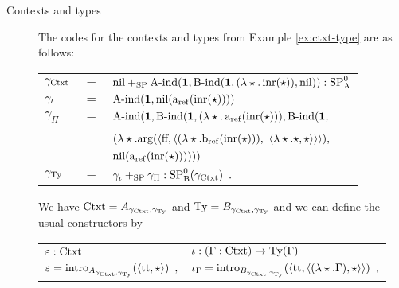\documentclass{article}
\begin{document}
\begin{description}







\item[Contexts and types]

The codes for the contexts and types from Example \ref{ex:ctxt-type} are as follows: \vskip
0.2cm
\begin{tabular}{lcl}
$\gamma_{\text{Ctxt}}$ &$=$& $\text{nil} +_{\text{SP}} \text{A-ind}(\mathbf{1}, \text{B-ind}(\mathbf{1}, (\lambda \star .\,\text{inr}(\star)),
\text{nil})) : \text{SP}^{0}_{\mathrm{A}}$ \\
$\gamma_{\iota}$ &$=$& $\text{A-ind}(\mathbf{1}, \text{nil}(\text{a}_{\mathrm{ref}}(\text{inr}(\star))))$ \\
$\gamma_{\Pi}$ &$=$& $\text{A-ind}(\mathbf{1}, \text{B-ind}(\mathbf{1}, (\lambda \star.\,\text{a}_{\mathrm{ref}}(\text{inr}(\star))),\text{B-ind}(\mathbf{1},$ \\
&& \qquad\quad $(\lambda \star.\text{arg}(\langle \text{ff}, \langle (\lambda
\star.\text{b}_{\mathrm{ref}}(\text{inr}(\star))),$ 
 $\langle \lambda \star.\star, \star\rangle\rangle\rangle),$ \\
&& \qquad\qquad $\text{nil}(\text{a}_{\mathrm{ref}}(\text{inr}(\star))))))$ \\
$\gamma_{\text{Ty}}$ &$=$& $\gamma_{\iota} +_{\text{SP}} \gamma_{\Pi} : \text{SP}^{0}_{\mathrm{B}}(\gamma_{\text{Ctxt}})\enspace .$
\end{tabular}
\vskip 0.2cm \noindent
We have $\text{Ctxt} = A_{\gamma_{\text{Ctxt}}, \gamma_{\text{Ty}}}$ and $\text{Ty} =
B_{\gamma_{\text{Ctxt}}, \gamma_{\text{Ty}}}$
and we can define the usual constructors by
\vskip 0.2cm
\begin{tabular}{l@{\qquad\qquad}l}
  $\varepsilon : \text{Ctxt}$ & $\iota : (\Gamma : \text{Ctxt}) \to \text{Ty}(\Gamma)$ \\
  $\varepsilon = \text{intro}_{A_{\gamma_{\text{Ctxt}}, \gamma_{\text{Ty}}}}(\langle \text{tt}, \star\rangle)\enspace ,$ & $\iota_{\Gamma} = \text{intro}_{B_{\gamma_{\text{Ctxt}}, \gamma_{\text{Ty}}}}(\langle \text{tt}, \langle (\lambda \star.\Gamma), \star\rangle\rangle)\enspace ,$\\
\end{tabular}
\vskip 0.2cm
\begin{tabular}{l}

\end{tabular}
\end{description}
\end{document}
